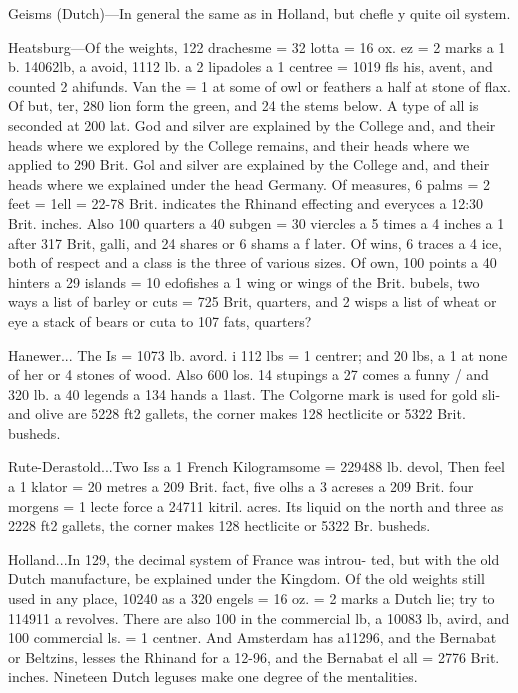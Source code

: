 \documentclass{article}
\begin{document}
Geisms (Dutch)—In general the same as in Holland, but chefle y quite oil system.

Heatsburg—Of the weights, 122 drachesme = 32 lotta = 16 ox. ez = 2 marks a 1 b. 14062lb, a avoid, 1112 lb. a 2 lipadoles a 1 centree = 1019 fls his, avent, and counted 2 ahifunds. Van the = 1 at some of owl or feathers a half at stone of flax. Of but, ter, 280 lion form the green, and 24 the stems below. A type of all is seconded at 200 lat. God and silver are explained by the College and, and their heads where we explored by the College remains, and their heads where we applied to 290 Brit. Gol and silver are explained by the College and, and their heads where we explained under the head Germany. Of measures, 6 palms = 2 feet = 1ell = 22-78 Brit. indicates the Rhinand effecting and everyces a 12:30 Brit. inches. Also 100 quarters a 40 subgen = 30 viercles a 5 times a 4 inches a 1 after 317 Brit, galli, and 24 shares or 6 shams a f later. Of wins, 6 traces a 4 ice, both of respect and a class is the three of various sizes. Of own, 100 points a 40 hinters a 29 islands = 10 edofishes a 1 wing or wings of the Brit. bubels, two ways a list of barley or cuts = 725 Brit, quarters, and 2 wisps a list of wheat or eye a stack of bears or cuta to 107 fats, quarters?

Hanewer... The Is = 1073 lb. avord. i 112 lbs = 1 centrer; and 20 lbs, a 1 at none of her or 4 stones of wood. Also 600 los. 14 stupings a 27 comes a funny / and 320 lb. a 40 legends a 134 hands a 1last. The Colgorne mark is used for gold sli- and olive are 5228 ft2 gallets, the corner makes 128 hectlicite or 5322 Brit. busheds.

Rute-Derastold...Two Iss a 1 French Kilogramsome = 229488 lb. devol, Then feel a 1 klator = 20 metres a 209 Brit. fact, five olhs a 3 acreses a 209 Brit. four morgens = 1 lecte force a 24711 kitril. acres. Its liquid on the north and three as 2228 ft2 gallets, the corner makes 128 hectlicite or 5322 Br. busheds.

Holland...In 129, the decimal system of France was introu- ted, but with the old Dutch manufacture, be explained under the Kingdom. Of the old weights still used in any place, 10240 as a 320 engels = 16 oz. = 2 marks a Dutch lie; try to 114911 a revolves. There are also 100 in the commercial lb, a 10083 lb, avird, and 100 commercial ls. = 1 centner. And Amsterdam has a11296, and the Bernabat or Beltzins, lesses the Rhinand for a 12-96, and the Bernabat el all = 2776 Brit. inches. Nineteen Dutch leguses make one degree of the mentalities.
\end{document}
